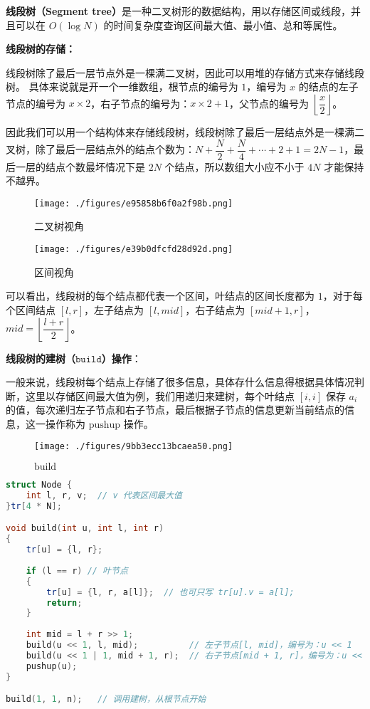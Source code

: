 
\textbf{线段树（Segment tree）}是一种二叉树形的数据结构，用以存储区间或线段，并且可以在 $O(\log N)$ 的时间复杂度查询区间最大值、最小值、总和等属性。

\textbf{线段树的存储：}

线段树除了最后一层节点外是一棵满二叉树，因此可以用堆的存储方式来存储线段树。
具体来说就是开一个一维数组，根节点的编号为 $1$，编号为 $x$ 的结点的左子节点的编号为 $x \times 2$，右子节点的编号为：$x \times 2 + 1$，父节点的编号为 $\left\lfloor\dfrac{x}{2}\right\rfloor$。

因此我们可以用一个结构体来存储线段树，线段树除了最后一层结点外是一棵满二叉树，除了最后一层结点外的结点个数为：$N + \dfrac{N}{2} + \dfrac{N}{4} + \cdots + 2 + 1 = 2N - 1$，最后一层的结点个数最坏情况下是 $2N$ 个结点，所以数组大小应不小于 $4N$ 才能保持不越界。

\begin{figure}[ht]
\centering
\texttt{[image: ./figures/e95858b6f0a2f98b.png]}
\caption{二叉树视角} \label{fig_STree_1}
\end{figure}

\begin{figure}[ht]
\centering
\texttt{[image: ./figures/e39b0dfcfd28d92d.png]}
\caption{区间视角} \label{fig_STree_2}
\end{figure}


可以看出，线段树的每个结点都代表一个区间，叶结点的区间长度都为 $1$，对于每个区间结点 $[l, r]$，左子结点为 $[l, mid]$，右子结点为 $[mid + 1, r]$，$mid = \left\lfloor\dfrac{l+r}{2}\right\rfloor$。

\textbf{线段树的建树（$\texttt{build}$）操作}：

一般来说，线段树每个结点上存储了很多信息，具体存什么信息得根据具体情况判断，这里以存储区间最大值为例，我们用递归来建树，每个叶结点 $[i, i]$ 保存 $a_i$ 的值，每次递归左子节点和右子节点，最后根据子节点的信息更新当前结点的信息，这一操作称为 $\text{pushup}$ 操作。

\begin{figure}[ht]
\centering
\texttt{[image: ./figures/9bb3ecc13bcaea50.png]}
\caption{$\text{build}$} \label{fig_STree_3}
\end{figure}


\begin{lstlisting}[language=cpp]
struct Node {
    int l, r, v;  // v 代表区间最大值
}tr[4 * N];

void build(int u, int l, int r) 
{
    tr[u] = {l, r};
    
    if (l == r) // 叶节点
    {
        tr[u] = {l, r, a[l]};  // 也可只写 tr[u].v = a[l];
        return;
    }
    
    int mid = l + r >> 1;
    build(u << 1, l, mid);          // 左子节点[l, mid]，编号为：u << 1
    build(u << 1 | 1, mid + 1, r);  // 右子节点[mid + 1, r]，编号为：u << 1 | 1
    pushup(u);
}

build(1, 1, n);   // 调用建树，从根节点开始
\end{lstlisting}


